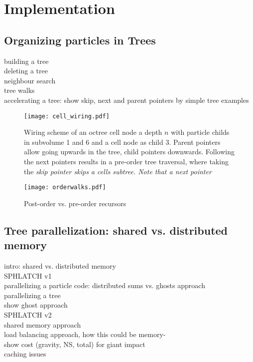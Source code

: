 \section{Implementation}
\subsection{Organizing particles in Trees}
building a tree\\
deleting a tree\\
neighbour search\\
tree walks\\
accelerating a tree: show skip, next and parent pointers by simple tree examples\\

\begin{figure}[htbp]
\begin{center}
\texttt{[image: cell\_wiring.pdf]}
\caption{Wiring scheme of an octree cell node a depth $n$ with particle childs in subvolume 1 and 6 and a cell node as child 3. Parent pointers allow going upwards in the tree, child pointers downwards. Following the next pointers results in a pre-order tree traversal, where taking the \it{skip} pointer skips a cells subtree. Note that a \it{next} pointer }
\label{fig02walks}
\end{center}
\end{figure}


\begin{figure}[htbp]
\begin{center}
\texttt{[image: orderwalks.pdf]}
\caption{Post-order vs. pre-order recursors}
\label{fig02walks}
\end{center}
\end{figure}


\subsection{Tree parallelization: shared vs. distributed memory}
intro: shared vs. distributed memory\\

SPHLATCH v1\\
parallelizing a particle code: distributed sums vs. ghosts approach\\
parallelizing a tree\\
show ghost approach\\

SPHLATCH v2\\
shared memory approach\\
load balancing approach, how this could be memory-\\
show cost (gravity, NS, total) for giant impact\\
caching issues\\


